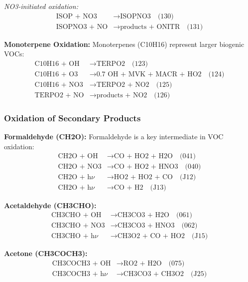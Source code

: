 \documentclass[12pt,a4paper]{article}
\begin{document}
\textit{NO3-initiated oxidation:}
\begin{align}
\text{ISOP + NO3} &\rightarrow \text{ISOPNO3} \quad \text{(130)} \\
\text{ISOPNO3 + NO} &\rightarrow \text{products + ONITR} \quad \text{(131)}
\end{align}

\textbf{Monoterpene Oxidation:}
Monoterpenes (C10H16) represent larger biogenic VOCs:
\begin{align}
\text{C10H16 + OH} &\rightarrow \text{TERPO2} \quad \text{(123)} \\
\text{C10H16 + O3} &\rightarrow \text{0.7 OH + MVK + MACR + HO2} \quad \text{(124)} \\
\text{C10H16 + NO3} &\rightarrow \text{TERPO2 + NO2} \quad \text{(125)} \\
\text{TERPO2 + NO} &\rightarrow \text{products + NO2} \quad \text{(126)}
\end{align}

\subsubsection{Oxidation of Secondary Products}

\textbf{Formaldehyde (CH2O):}
Formaldehyde is a key intermediate in VOC oxidation:
\begin{align}
\text{CH2O + OH} &\rightarrow \text{CO + HO2 + H2O} \quad \text{(041)} \\
\text{CH2O + NO3} &\rightarrow \text{CO + HO2 + HNO3} \quad \text{(040)} \\
\text{CH2O + h$\nu$} &\rightarrow \text{HO2 + HO2 + CO} \quad \text{(J12)} \\
\text{CH2O + h$\nu$} &\rightarrow \text{CO + H2} \quad \text{(J13)}
\end{align}

\textbf{Acetaldehyde (CH3CHO):}
\begin{align}
\text{CH3CHO + OH} &\rightarrow \text{CH3CO3 + H2O} \quad \text{(061)} \\
\text{CH3CHO + NO3} &\rightarrow \text{CH3CO3 + HNO3} \quad \text{(062)} \\
\text{CH3CHO + h$\nu$} &\rightarrow \text{CH3O2 + CO + HO2} \quad \text{(J15)}
\end{align}

\textbf{Acetone (CH3COCH3):}
\begin{align}
\text{CH3COCH3 + OH} &\rightarrow \text{RO2 + H2O} \quad \text{(075)} \\
\text{CH3COCH3 + h$\nu$} &\rightarrow \text{CH3CO3 + CH3O2} \quad \text{(J25)}
\end{align}
\end{document}
